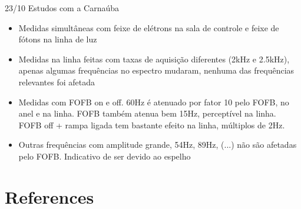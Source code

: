 \documentclass{beamer}					  %
\begin{document}
\begin{frame}{23/10 Estudos com a Carnaúba}
    \begin{itemize}
        \item Medidas simultâneas com feixe de elétrons na sala de controle e feixe de fótons na linha de luz
        \item Medidas na linha feitas com taxas de aquisição diferentes (2kHz e 2.5kHz), apenas algumas frequências no espectro mudaram, nenhuma das frequências relevantes foi afetada
        \item Medidas com FOFB on e off. 60Hz é atenuado por fator 10 pelo FOFB, no anel e na linha. FOFB também atenua bem 15Hz, perceptível na linha. FOFB off + rampa ligada tem bastante efeito na linha, múltiplos de 2Hz.
        \item Outras frequências com amplitude grande, 54Hz, 89Hz, (...) não são afetadas pelo FOFB. Indicativo de ser devido ao espelho
	\end{itemize}
\end{frame}





\section{References}
\end{document}
